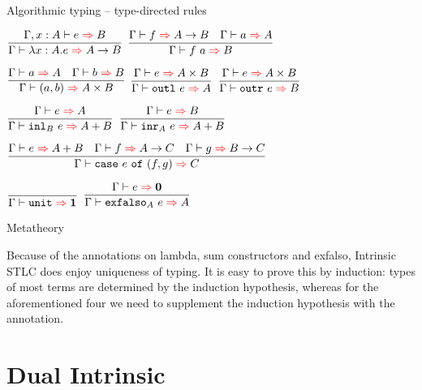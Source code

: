 \documentclass{beamer}
\newcommand{\Fun}[2]{#1 \to #2}
\newcommand{\Prod}[2]{#1 \times #2}
\newcommand{\Sum}[2]{#1 + #2}
\newcommand{\Unit}{\textbf{1}}
\newcommand{\Empty}{\textbf{0}}
\newcommand{\app}[2]{#1\ #2}
\newcommand{\pair}[2]{(#1, #2)}
\newcommand{\outl}[1]{\texttt{outl}\ #1}
\newcommand{\outr}[1]{\texttt{outr}\ #1}
\newcommand{\case}[3]{\texttt{case}\ #1\ \texttt{of}\ (#2, #3)}
\newcommand{\unit}{\texttt{unit}}
\newcommand{\rulename}[1]{\textsc{\footnotesize{#1}}}
\newcommand{\infrule}[3][]{\displaystyle \frac{#2}{#3} \rulename{#1}}
\newcommand{\extend}[3]{#1, #2 : #3}
\begin{document}
\begin{frame}{Algorithmic typing -- type-directed rules}

\begin{center}
  $\infrule{\fullinfer{\extend{\Gamma}{x}{A}}{e}{B}}{\infer{\ifun{x}{A}{e}}{\Fun{A}{B}}}$ \quad
  $\infrule{\infer{f}{\Fun{A}{B}} \quad \infer{a}{A}}{\infer{\app{f}{a}}{B}}$

  \vspace{2em}

  $\infrule{\infer{a}{A} \quad \infer{b}{B}}{\infer{\pair{a}{b}}{\Prod{A}{B}}}$ \quad
  $\infrule{\infer{e}{\Prod{A}{B}}}{\infer{\outl{e}}{A}}$ \quad
  $\infrule{\infer{e}{\Prod{A}{B}}}{\infer{\outr{e}}{B}}$

  \vspace{2em}

  $\infrule{\infer{e}{A}}{\infer{\iinl{B}{e}}{\Sum{A}{B}}}$ \quad
  $\infrule{\infer{e}{B}}{\infer{\iinr{A}{e}}{\Sum{A}{B}}}$

  \vspace{2em}

  $\infrule{\infer{e}{\Sum{A}{B}} \quad \infer{f}{\Fun{A}{C}} \quad \infer{g}{\Fun{B}{C}}}{\infer{\case{e}{f}{g}}{C}}$

  \vspace{2em}

  $\infrule{}{\infer{\unit}{\Unit}}$ \quad
  $\infrule{\infer{e}{\Empty}}{\infer{\iexfalso{A}{e}}{A}}$
\end{center}

\end{frame}

\begin{frame}{Metatheory}

Because of the annotations on lambda, sum constructors and exfalso, Intrinsic STLC does enjoy uniqueness of typing. It is easy to prove this by induction: types of most terms are determined by the induction hypothesis, whereas for the aforementioned four we need to supplement the induction hypothesis with the annotation.

\end{frame}

\section{Dual Intrinsic}

\newcommand{\iapp}[3]{\texttt{app}_{#1}\ #2\ #3}
\newcommand{\ioutl}[2]{\texttt{outl}_{#1}\ #2}
\newcommand{\ioutr}[2]{\texttt{outr}_{#1}\ #2}
\newcommand{\icase}[5]{\texttt{case}_{#1, #2}\ #3\ \texttt{of}\ (#4, #5)}
\end{document}
